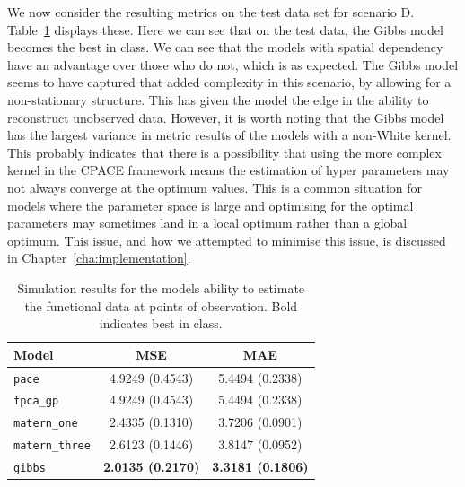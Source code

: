 We now consider the resulting metrics on the test data set for scenario D.
Table~\ref{tab:test_D} displays these.
Here we can see that on the test data, the Gibbs model becomes the best in class.
We can see that the models with spatial dependency have an advantage over those who do not, which is as expected.
The Gibbs model seems to have captured that added complexity in this scenario, by allowing for a non-stationary structure. 
This has given the model the edge in the ability to reconstruct unobserved data.
However, it is worth noting that the Gibbs model has the largest variance in metric results of the models with a non-White kernel.
This probably indicates that there is a possibility that using the more complex kernel in the CPACE framework means the estimation of hyper parameters may not always converge at the optimum values.
This is a common situation for models where the parameter space is large and optimising for the optimal parameters may sometimes land in a local optimum rather than a global optimum. 
This issue, and how we attempted to minimise this issue, is discussed in Chapter~\ref{cha:implementation}.

\begin{table}[b]
	\caption[Simulation results for Scenario D on test data]{Simulation results for the models ability to estimate the functional data at points of observation. Bold indicates best in class.}
	\centering
	\label{tab:test_D}
	\begin{tabular}{lcc}
		\toprule
		\textbf{Model} & \textbf{MSE} & \textbf{MAE} \\
		\midrule
		\verb*|pace| & 4.9249 (0.4543)& 5.4494 (0.2338)\\
		\verb*|fpca_gp| & 4.9249 (0.4543)& 5.4494 (0.2338)\\
		\verb*|matern_one| & 2.4335	(0.1310) & 3.7206 (0.0901) \\
		\verb*|matern_three| & 2.6123 (0.1446)& 3.8147 (0.0952) \\
		\verb*|gibbs| & \textbf{2.0135 (0.2170)} & \textbf{3.3181 (0.1806)}\\
		\bottomrule
	\end{tabular}
\end{table}

